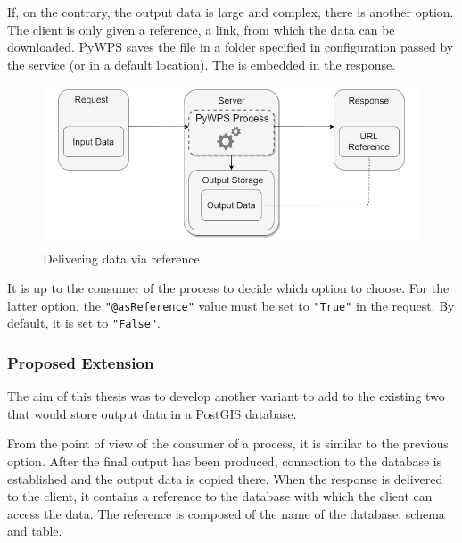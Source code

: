   If, on the contrary, the output data is large and complex, there is
  another option. The client is only given a reference, a 
  link, from which the data can be downloaded. PyWPS saves the file in
  a folder specified in configuration passed by the service (or in a
  default location). The  is embedded in the 
  response. \cite{pywpsurl}

\begin{figure}[H] \centering
      \includegraphics[width=370pt]{./pictures/optiontwo.png}
      \caption[Delivering data via  reference]{Delivering data via  reference}
      \label{fig:optiontwo}
  \end{figure}

  It is up to the consumer of the process to decide which option to
  choose. For the latter option, the \texttt{"@asReference"} value
  must be set to \texttt{"True"} in the request. \cite{asref} By
  default, it is set to \texttt{"False"}.


\subsubsection{Proposed Extension} 

The aim of this thesis was to develop another variant to add to the
existing two that would store output data in a PostGIS database.

From the point of view of the consumer of a process, it is similar to
the previous option. After the final output has been produced,
connection to the database is established and the output data is
copied there. When the  response is delivered to the client,
it contains a reference to the database with which the client can
access the data. The reference is composed of the name of the
database, schema and table.

